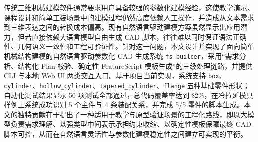 传统三维机械建模软件通常要求用户具备较强的参数化建模经验，这使教学演示、课程设计和简单工装场景中的建模过程仍然高度依赖人工操作，并造成从文本需求到三维表达之间的转换成本偏高。现有自然语言驱动建模方案虽然显示出应用潜力，但若直接依赖大语言模型自由生成 CAD 脚本，往往难以同时保证语法正确性、几何语义一致性和工程可验证性。针对这一问题，本文设计并实现了面向简单机械结构建模的自然语言驱动参数化 CAD 生成系统 \texttt{fs-builder}，采用“需求分析、结构化 Plan 校验、确定性 FeatureScript 模板生成”的三级处理链路，并提供 CLI 与本地 Web UI 两类交互入口。基于项目当前实现，系统支持 \texttt{box}、\texttt{cylinder}、\texttt{hollow\_cylinder}、\texttt{tapered\_cylinder}、\texttt{flange} 五种基础零件形状；自动化测试结果显示 50 项测试全部通过，总代码覆盖率达到 82\%，在冷拉延模具样例上系统成功识别 5 个主件与 4 条装配关系，并完成 5/5 零件的脚本生成。本文的独特贡献在于提出了一种适用于教学与原型验证场景的工程化路线，即以大模型负责需求理解、以强类型中间表示承担约束收缩、以确定性模板保障最终 CAD 脚本可控，从而在自然语言灵活性与参数化建模稳定性之间建立可实现的平衡。
